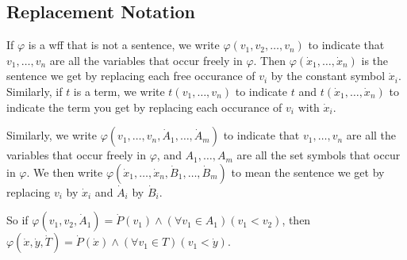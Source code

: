 \subsection{Replacement Notation}
If $\varphi$ is a wff that is not a sentence, we write $\varphi(v_1, v_2, \ldots, v_n)$ to indicate that $v_1, \ldots, v_n$ are all the variables that occur freely in $\varphi$. Then $\varphi(\dot x_1, \ldots, \dot x_n)$ is the sentence we get by replacing each free occurance of $v_i$ by the constant symbol $\dot x_i$. Similarly, if $t$ is a term, we write $t(v_1, \ldots, v_n)$ to indicate $t$ and $t(\dot x_1, \ldots, \dot x_n)$ to indicate the term you get by replacing each occurance of $v_i$ with $\dot x_i$.

Similarly, we write $\varphi(v_1, \ldots, v_n, \dot A_1, \ldots, \dot A_m)$ to indicate that $v_1, \ldots, v_n$ are all the variables that occur freely in $\varphi$, and $A_1, \ldots, A_m$ are all the set symbols that occur in $\varphi$. We then write $\varphi(\dot x_1, \ldots, \dot x_n, \dot B_1, \ldots, \dot B_m)$ to mean the sentence we get by replacing $v_i$ by $\dot x_i$ and $\dot A_i$ by $\dot B_i$.

So if $\varphi(v_1, v_2, \dot A_1) = \dot P(v_1) \land (\forall v_1 \in A_1) (v_1 < v_2)$, then $\varphi(\dot x, \dot y, \dot T) = \dot P(\dot x) \land (\forall v_1 \in T) (v_1 < \dot y)$.

